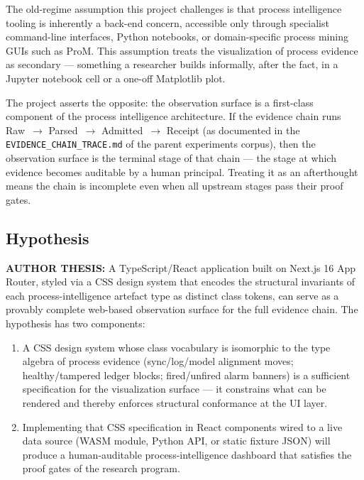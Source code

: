 The old-regime assumption this project challenges is that process intelligence tooling is
inherently a back-end concern, accessible only through specialist command-line interfaces,
Python notebooks, or domain-specific process mining GUIs such as ProM. This assumption
treats the visualization of process evidence as secondary --- something a researcher builds
informally, after the fact, in a Jupyter notebook cell or a one-off Matplotlib plot.

The project asserts the opposite: the observation surface is a first-class component of the
process intelligence architecture. If the evidence chain runs Raw~$\to$ Parsed~$\to$
Admitted~$\to$ Receipt (as documented in the \texttt{EVIDENCE\_CHAIN\_TRACE.md} of the parent
experiments corpus), then the observation surface is the terminal stage of that chain --- the
stage at which evidence becomes auditable by a human principal. Treating it as an afterthought
means the chain is incomplete even when all upstream stages pass their proof gates.

\subsection{Hypothesis}
\label{sec:experiments-visualizer-nextjs-rq-hypothesis}

\textbf{AUTHOR THESIS:} A TypeScript/React application built on Next.js 16 App Router, styled
via a CSS design system that encodes the structural invariants of each process-intelligence
artefact type as distinct class tokens, can serve as a provably complete web-based observation
surface for the full evidence chain. The hypothesis has two components:

\begin{enumerate}
  \item A CSS design system whose class vocabulary is isomorphic to the type algebra of process
        evidence (sync/log/model alignment moves; healthy/tampered ledger blocks; fired/unfired
        alarm banners) is a sufficient specification for the visualization surface --- it
        constrains what can be rendered and thereby enforces structural conformance at the UI layer.
  \item Implementing that CSS specification in React components wired to a live data source
        (WASM module, Python API, or static fixture JSON) will produce a human-auditable
        process-intelligence dashboard that satisfies the proof gates of the research program.
\end{enumerate}

